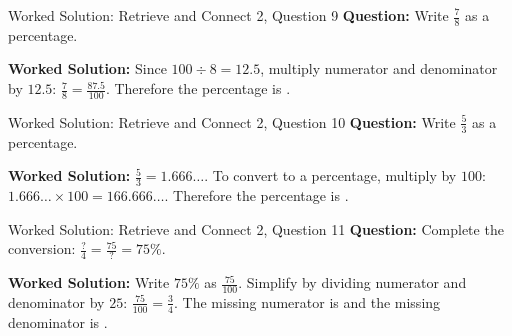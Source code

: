 \documentclass{beamer}
\newcommand{\ablank}[1]{%
  \alt<2>{\textcolor{red}{#1}}{\underline{\phantom{#1}}}%
}
\begin{document}
\begin{frame}[t]{Worked Solution: Retrieve and Connect 2, Question 9}
\textbf{Question:} Write \(\frac{7}{8}\) as a percentage.

\smallskip
\textbf{Worked Solution:} Since \(100 \div 8 = 12.5\), multiply numerator and denominator by \(12.5\): \(\frac{7}{8} = \frac{87.5}{100}\). Therefore the percentage is \ablank{$87.5\%$}.
\end{frame}

\begin{frame}[t]{Worked Solution: Retrieve and Connect 2, Question 10}
\textbf{Question:} Write \(\frac{5}{3}\) as a percentage.

\smallskip
\textbf{Worked Solution:} \(\frac{5}{3} = 1.666\ldots\). To convert to a percentage, multiply by \(100\): \(1.666\ldots \times 100 = 166.666\ldots\). Therefore the percentage is \ablank{$166.\dot{6}\%$}.
\end{frame}

\begin{frame}[t]{Worked Solution: Retrieve and Connect 2, Question 11}
\textbf{Question:} Complete the conversion: \(\frac{?}{4} = \frac{75}{?} = 75\%\).

\smallskip
\textbf{Worked Solution:} Write \(75\%\) as \(\frac{75}{100}\). Simplify by dividing numerator and denominator by \(25\): \(\frac{75}{100} = \frac{3}{4}\). The missing numerator is \ablank{$3$} and the missing denominator is \ablank{$100$}.
\end{frame}
\end{document}
